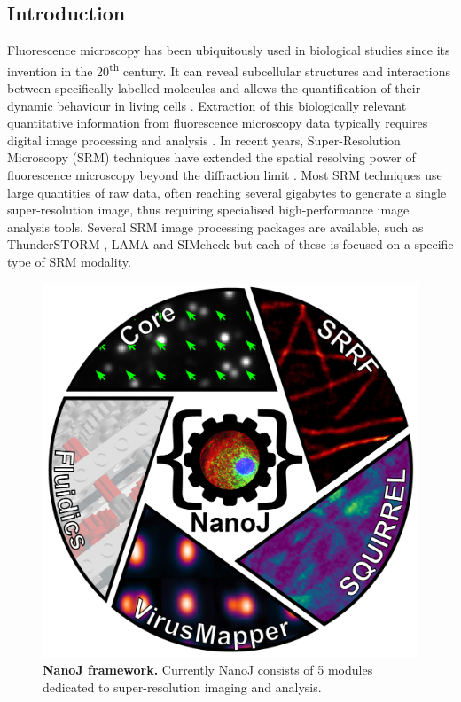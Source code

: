 \subsection*{Introduction}
Fluorescence microscopy has been ubiquitously used in biological studies since its invention in the 20\textsuperscript{th} century. It can reveal subcellular structures and interactions between specifically labelled molecules and allows the quantification of their dynamic behaviour in living cells \cite{rino2009frontiers}. Extraction of this biologically relevant quantitative information from fluorescence microscopy data typically requires digital image processing and analysis \cite{wheeler2017standard}. In recent years, Super-Resolution Microscopy (SRM) techniques have extended the spatial resolving power of fluorescence microscopy beyond the diffraction limit \cite{betzig2006imaging,rust2006sub,hell1994breaking}. Most SRM techniques use large quantities of raw data, often reaching several gigabytes to generate a single super-resolution image, thus requiring specialised high-performance image analysis tools. Several SRM image processing packages are available, such as ThunderSTORM \cite{ovesny2014thunderstorm}, LAMA \cite{malkusch2016extracting} and SIMcheck \cite{schermelleh2015simcheck} but each of these is focused on a specific type of SRM modality.
  
 \begin{figure}[!t]
    \centering
    \includegraphics[width=0.8\linewidth]{Figures/FigureMain_v4.png}
    \caption{\textbf{NanoJ framework.} Currently NanoJ consists of 5 modules dedicated to super-resolution imaging and analysis.}
    \label{fig:GeneralDiagram}
 \end{figure}
 
